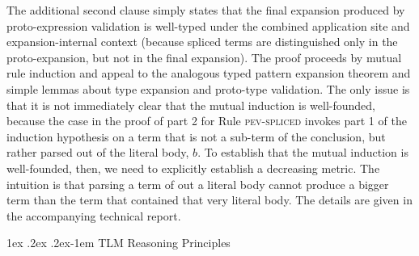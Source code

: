 \documentclass[acmsmall,screen]{acmart}
\makeatletter
\renewcommand{\subsubsection}{%
  \@startsection{subsubsection}{3}%
  {\z@}{1ex \@plus .2ex \@minus .2ex}{-1em}%
  {\sffamily\normalsize\itshape\maybe@addperiod}%
}
\newcommand{\maybe@addperiod}[1]{%
  #1\@addpunct{.}%
}
\makeatother
\begin{document}
The additional second clause simply states that the final expansion produced by proto-expression validation is well-typed under the combined application site and expansion-internal context (because spliced terms are distinguished only in the proto-expansion, but not in the final expansion). %
The proof proceeds by mutual rule induction and appeal to the analogous typed pattern expansion theorem and simple lemmas about type expansion   and proto-type validation. The only issue is that it is not immediately clear that the mutual induction is well-founded, because the case in the proof of part 2 for Rule \textsc{pev-spliced} invokes part 1 of the induction hypothesis on a term that is not a sub-term of the conclusion, but rather parsed out of the literal body, $b$. To establish that the mutual induction is well-founded, then, we need to explicitly establish a decreasing metric. The intuition is that parsing a term of out a literal body cannot produce a bigger term than the term that contained that very literal body. 
The details are given in the accompanying technical report.



\subsubsection{TLM Reasoning Principles} 
\end{document}

